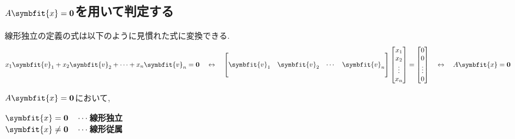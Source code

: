 \subsection{$A\symbfit{x}=\mathbf{0}$を用いて判定する}
線形独立の定義の式は以下のように見慣れた式に変換できる.
\[
x_1\symbfit{v}_1+x_2\symbfit{v}_2+\cdots+x_n\symbfit{v}_n=\mathbf{0}
\quad\leftrightarrow \quad
\begin{bmatrix}
    &&\\
    \symbfit{v}_1 & \symbfit{v}_2 & \cdots & \symbfit{v}_n\\
    &&\\
\end{bmatrix}
\begin{bmatrix}
    x_1 \\ x_2 \\ \vdots \\ x_n
\end{bmatrix}
=
\begin{bmatrix}
    0 \\ 0 \\ \vdots \\ 0
\end{bmatrix}
\quad \leftrightarrow \quad
A\symbfit{x}=\mathbf{0}
\]
\begin{framed}
    $A\symbfit{x}=\mathbf{0}$において,
\begin{center}
$\symbfit{x}=\mathbf{0} \quad \cdots$\textbf{線形独立}\\
$\symbfit{x} \neq \mathbf{0} \quad \cdots$\textbf{線形従属}
\end{center}
\end{framed}
